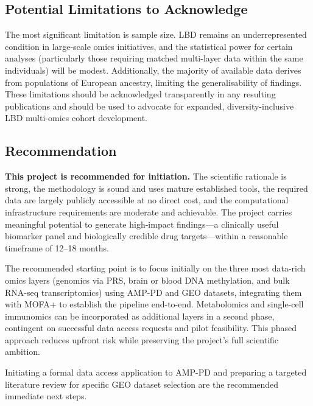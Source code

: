 \subsection{Potential Limitations to Acknowledge}

The most significant limitation is sample size. LBD remains an underrepresented condition in large-scale omics initiatives, and the statistical power for certain analyses (particularly those requiring matched multi-layer data within the same individuals) will be modest. Additionally, the majority of available data derives from populations of European ancestry, limiting the generalisability of findings. These limitations should be acknowledged transparently in any resulting publications and should be used to advocate for expanded, diversity-inclusive LBD multi-omics cohort development.

\subsection{Recommendation}

\textbf{This project is recommended for initiation.} The scientific rationale is strong, the methodology is sound and uses mature established tools, the required data are largely publicly accessible at no direct cost, and the computational infrastructure requirements are moderate and achievable. The project carries meaningful potential to generate high-impact findings---a clinically useful biomarker panel and biologically credible drug targets---within a reasonable timeframe of 12--18 months.

The recommended starting point is to focus initially on the three most data-rich omics layers (genomics via PRS, brain or blood DNA methylation, and bulk RNA-seq transcriptomics) using AMP-PD and GEO datasets, integrating them with MOFA+ to establish the pipeline end-to-end. Metabolomics and single-cell immunomics can be incorporated as additional layers in a second phase, contingent on successful data access requests and pilot feasibility. This phased approach reduces upfront risk while preserving the project's full scientific ambition.

Initiating a formal data access application to AMP-PD and preparing a targeted literature review for specific GEO dataset selection are the recommended immediate next steps.
